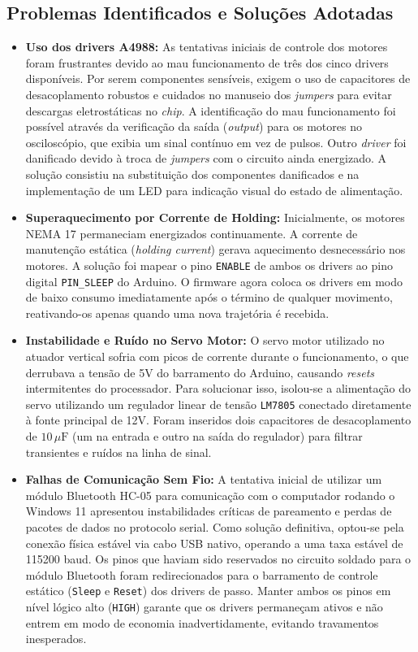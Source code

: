 \documentclass[11pt,a4paper]{article}
\begin{document}
\subsection{Problemas Identificados e Soluções Adotadas}
\begin{itemize}
    \item \textbf{Uso dos drivers A4988:} As tentativas iniciais de controle dos motores foram frustrantes devido ao mau funcionamento de três dos cinco drivers disponíveis. Por serem componentes sensíveis, exigem o uso de capacitores de desacoplamento robustos e cuidados no manuseio dos \textit{jumpers} para evitar descargas eletrostáticas no \textit{chip}. A identificação do mau funcionamento foi possível através da verificação da saída (\textit{output}) para os motores no osciloscópio, que exibia um sinal contínuo em vez de pulsos. Outro \textit{driver} foi danificado devido à troca de \textit{jumpers} com o circuito ainda energizado. A solução consistiu na substituição dos componentes danificados e na implementação de um LED para indicação visual do estado de alimentação.
    \item \textbf{Superaquecimento por Corrente de Holding:} Inicialmente, os motores NEMA 17 permaneciam energizados continuamente. A corrente de manutenção estática (\textit{holding current}) gerava aquecimento desnecessário nos motores. A solução foi mapear o pino \texttt{ENABLE} de ambos os drivers ao pino digital \texttt{PIN\_SLEEP} do Arduino. O firmware agora coloca os drivers em modo de baixo consumo imediatamente após o término de qualquer movimento, reativando-os apenas quando uma nova trajetória é recebida. 
    \item \textbf{Instabilidade e Ruído no Servo Motor:} O servo motor utilizado no atuador vertical sofria com picos de corrente durante o funcionamento, o que derrubava a tensão de 5V do barramento do Arduino, causando \textit{resets} intermitentes do processador. Para solucionar isso, isolou-se a alimentação do servo utilizando um regulador linear de tensão \texttt{LM7805} conectado diretamente à fonte principal de 12V. Foram inseridos dois capacitores de desacoplamento de $10\,\mu\text{F}$ (um na entrada e outro na saída do regulador) para filtrar transientes e ruídos na linha de sinal.
    \item \textbf{Falhas de Comunicação Sem Fio:} A tentativa inicial de utilizar um módulo Bluetooth HC-05 para comunicação com o computador rodando o Windows 11 apresentou instabilidades críticas de pareamento e perdas de pacotes de dados no protocolo serial. Como solução definitiva, optou-se pela conexão física estável via cabo USB nativo, operando a uma taxa estável de 115200 baud. Os pinos que haviam sido reservados no circuito soldado para o módulo Bluetooth foram redirecionados para o barramento de controle estático (\texttt{Sleep} e \texttt{Reset}) dos drivers de passo. Manter ambos os pinos em nível lógico alto (\texttt{HIGH}) garante que os drivers permaneçam ativos e não entrem em modo de economia inadvertidamente, evitando travamentos inesperados.
\end{itemize}
\end{document}

